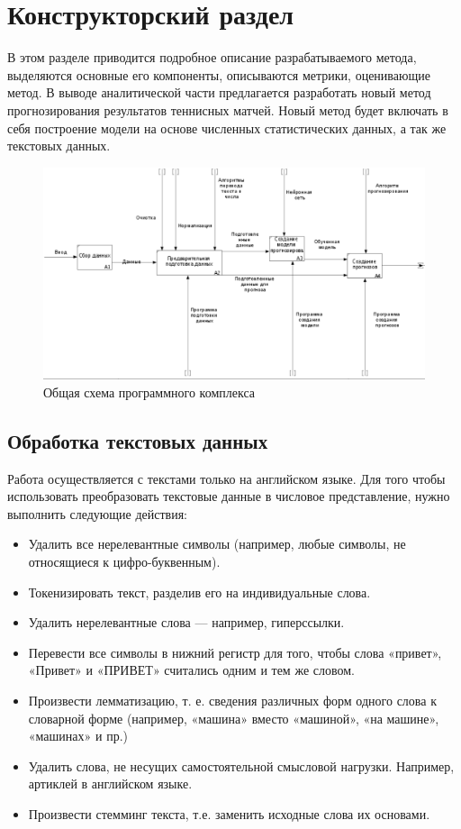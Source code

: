 \chapter{Конструкторский раздел}
В этом разделе приводится подробное описание разрабатываемого метода, выделяются основные его компоненты, описываются метрики, оценивающие метод. 
В выводе аналитической части предлагается разработать новый метод прогнозирования результатов теннисных матчей. Новый метод будет включать в себя построение модели на основе численных статистических данных, а так же текстовых данных.

\begin{figure}[!h]
	\centering
	\includegraphics[width=.9\textwidth]{diagrams/img/main_img_cut.png}
	\caption{Общая схема программного комплекса}
	\label{fig08}
\end{figure}
\section{Обработка текстовых данных}
Работа осуществляется с текстами только на английском языке.
Для того чтобы использовать преобразовать текстовые данные в числовое представление, нужно выполнить следующие действия:

\begin{itemize}
	\item Удалить все нерелевантные символы (например, любые символы, не относящиеся к цифро-буквенным).
	\item Токенизировать текст, разделив его на индивидуальные слова.
	\item Удалить нерелевантные слова — например,  гиперссылки.
	\item Перевести все символы в нижний регистр для того, чтобы слова «привет», «Привет» и «ПРИВЕТ» считались одним и тем же словом.

	\item Произвести лемматизацию, т. е. сведения различных форм одного слова к словарной форме (например, «машина» вместо «машиной», «на машине», «машинах» и пр.)
	\item Удалить слова, не несущих самостоятельной смысловой нагрузки. Например, артиклей в английском языке.
	\item Произвести стемминг текста, т.е. заменить исходные слова их основами.

\end{itemize}


